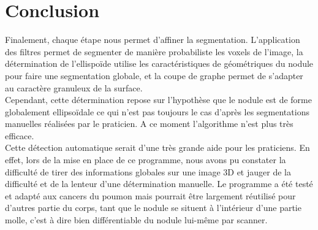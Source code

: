 \documentclass{article}
\begin{document}
\section*{Conclusion}
Finalement, chaque étape nous permet d'affiner la segmentation. L'application des filtres permet de segmenter de manière probabiliste les voxels de l'image, la détermination de l'ellispoïde utilise les caractéristiques de géométriques du nodule pour faire une segmentation globale, et la coupe de graphe permet de s'adapter au caractère granuleux de la surface.\\
Cependant, cette détermination repose sur l'hypothèse que le nodule est de forme globalement ellipsoïdale ce qui n'est pas toujours le cas d'après les segmentations manuelles réalisées par le praticien. A ce moment l'algorithme n'est plus très efficace.\\
Cette détection automatique serait d'une très grande aide pour les praticiens. En effet, lors de la mise en place de ce programme, nous avons pu constater la difficulté de tirer des informations globales sur une image 3D et jauger de la difficulté et de la lenteur d'une détermination manuelle. Le programme a été testé et adapté aux cancers du poumon mais pourrait être largement réutilisé pour d'autres partie du corps, tant que le nodule se situent à l'intérieur d'une partie molle, c'est à dire bien différentiable du nodule lui-même par scanner.

\end{document}
